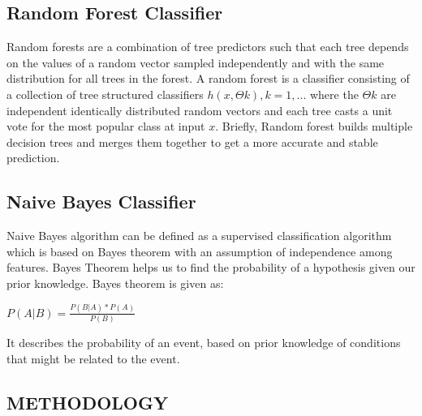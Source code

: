 \documentclass[a4paper, 12pt]{article}
\begin{document}
\subsection{Random Forest Classifier}
\par
\hspace{0.5cm}
Random forests are a combination of tree predictors such that each tree depends on the values of a random vector sampled independently and with the same distribution for all trees in the forest. A random forest is a classifier consisting of a collection of tree structured classifiers ${ h(x,Θk ), k=1, ...}$ where the ${Θk}$ are independent identically distributed random vectors and each tree casts a unit vote for the most popular class at input $x$.
Briefly, Random forest builds multiple decision trees and merges them together to get a more accurate and stable prediction.

\subsection{Naive Bayes Classifier}
\par
\hspace{0.5cm}
Naive Bayes algorithm can be defined as a supervised classification algorithm which is based on Bayes theorem with an assumption of independence among features. Bayes Theorem helps us to find the probability of a hypothesis given our prior knowledge. Bayes theorem is given as:
\par
\vspace{0.2cm}

\hfil $P(A|B) = \frac{P(B|A)*P(A)}{P(B)}$
\par
\vspace{0.2cm}
It describes the probability of an event, based on prior knowledge of conditions that might be related to the event.


\newpage
\begin{center}
\section{METHODOLOGY}

\end{center}
\end{document}
